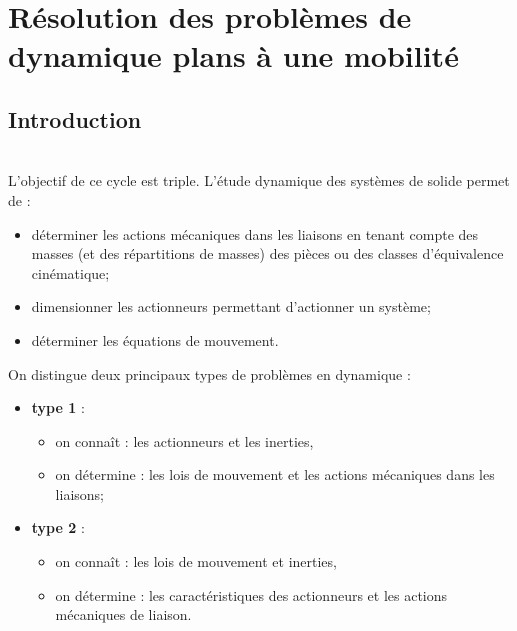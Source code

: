 \setchapterpreamble[u]{\margintoc}

\chapter{Résolution des problèmes de dynamique plans à une mobilité}




\def\xxnumchapitre{Chapitre 1 \vspace{.2cm}}
\def\xxchapitre{\hspace{.12cm} }


\section{Introduction}
\begin{obj} ~\\
L'objectif de ce cycle est triple. L'étude dynamique des systèmes de solide permet de :
\begin{itemize}
\item déterminer les actions mécaniques dans les liaisons en tenant compte des masses (et des répartitions de masses) des pièces ou des classes d'équivalence cinématique;
\item dimensionner les actionneurs permettant d'actionner un système; 
\item déterminer les équations de mouvement.
\end{itemize}
\end{obj}



On distingue deux principaux types de problèmes en dynamique : 
\begin{itemize}
\item \textbf{type 1} :
\begin{itemize}
\item on connaît : les actionneurs et les inerties,
\item on détermine : les lois de mouvement et les actions mécaniques dans les liaisons;
\end{itemize} 
\item \textbf{type 2} :
\begin{itemize}
\item on connaît : les lois de mouvement et inerties,
\item on détermine : les caractéristiques des actionneurs et les actions mécaniques de liaison.
\end{itemize}
\end{itemize}




